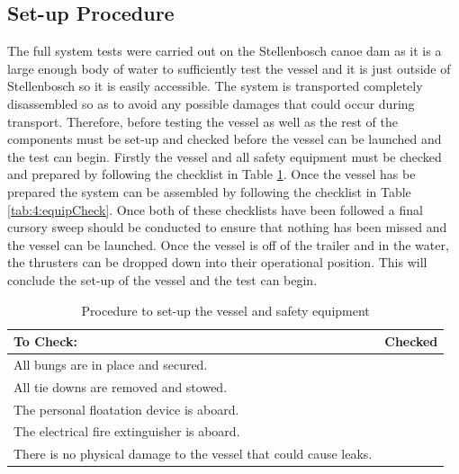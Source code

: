 \subsection{Set-up Procedure} 
The full system tests were carried out on the Stellenbosch canoe dam as it is a large enough body of water to sufficiently test the vessel and it is just outside of Stellenbosch so it is easily accessible. The system is transported completely disassembled so as to avoid any possible damages that could occur during transport. Therefore, before testing the vessel as well as the rest of the components must be set-up and checked before the vessel can be launched and the test can begin. Firstly the vessel and all safety equipment must be checked and prepared by following the checklist in Table \ref{tab:4:boatCheck}. Once the vessel has be prepared the system can be assembled by following the checklist in Table \ref{tab:4:equipCheck}. Once both of these checklists have been followed a final cursory sweep should be conducted to ensure that nothing has been missed and the vessel can be launched. Once the vessel is off of the trailer and in the water, the thrusters can be dropped down into their operational position. This will conclude the set-up of the vessel and the test can begin. 
\begin{table}
	\begin{center}
		
		\caption{Procedure to set-up the vessel and safety equipment}
		\label{tab:4:boatCheck}
		\begin{tabular}{|l|l|}
			\hline
			To Check: & Checked \\
			\hline
			All bungs are in place and secured. &\\
			\hline
			All tie downs are removed and stowed. &\\
			\hline
			The personal floatation device is aboard. &\\
			\hline
			The electrical fire extinguisher is aboard. &\\
			\hline
			There is no physical damage to the vessel that could cause leaks.&\\
			\hline
		\end{tabular}
	\end{center}
\end{table}
